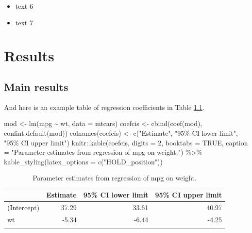 \documentclass[
  openany]{book}
\newenvironment{Shaded}{\begin{snugshade}}{\end{snugshade}}
\newcommand{\AttributeTok}[1]{\textcolor[rgb]{0.77,0.63,0.00}{#1}}
\newcommand{\ConstantTok}[1]{\textcolor[rgb]{0.00,0.00,0.00}{#1}}
\newcommand{\DecValTok}[1]{\textcolor[rgb]{0.00,0.00,0.81}{#1}}
\newcommand{\FunctionTok}[1]{\textcolor[rgb]{0.00,0.00,0.00}{#1}}
\newcommand{\NormalTok}[1]{#1}
\newcommand{\OtherTok}[1]{\textcolor[rgb]{0.56,0.35,0.01}{#1}}
\newcommand{\SpecialCharTok}[1]{\textcolor[rgb]{0.00,0.00,0.00}{#1}}
\newcommand{\StringTok}[1]{\textcolor[rgb]{0.31,0.60,0.02}{#1}}
\providecommand{\tightlist}{%
  \setlength{\itemsep}{0pt}\setlength{\parskip}{0pt}}
\begin{document}
\begin{itemize}
\tightlist
\item
  text 6
\item
  text 7
\end{itemize}

\hypertarget{results}{%
\chapter{Results}\label{results}}

\hypertarget{main-results}{%
\section{Main results}\label{main-results}}

And here is an example table of regression coefficients in Table \ref{tab:mtreg}.

\begin{Shaded}
\begin{Highlighting}[]
\NormalTok{mod }\OtherTok{\textless{}{-}} \FunctionTok{lm}\NormalTok{(mpg }\SpecialCharTok{\textasciitilde{}}\NormalTok{ wt, }\AttributeTok{data =}\NormalTok{ mtcars)}
\NormalTok{coefcis }\OtherTok{\textless{}{-}} \FunctionTok{cbind}\NormalTok{(}\FunctionTok{coef}\NormalTok{(mod), }\FunctionTok{confint.default}\NormalTok{(mod))}
\FunctionTok{colnames}\NormalTok{(coefcis) }\OtherTok{\textless{}{-}}
  \FunctionTok{c}\NormalTok{(}\StringTok{"Estimate"}\NormalTok{, }\StringTok{"95\% CI lower limit"}\NormalTok{, }\StringTok{"95\% CI upper limit"}\NormalTok{)}
\NormalTok{knitr}\SpecialCharTok{::}\FunctionTok{kable}\NormalTok{(coefcis,}
             \AttributeTok{digits =} \DecValTok{2}\NormalTok{,}
             \AttributeTok{booktabs =} \ConstantTok{TRUE}\NormalTok{,}
             \AttributeTok{caption =} \StringTok{"Parameter estimates from regression of mpg on weight."}\NormalTok{) }\SpecialCharTok{\%\textgreater{}\%}
  \FunctionTok{kable\_styling}\NormalTok{(}\AttributeTok{latex\_options =} \FunctionTok{c}\NormalTok{(}\StringTok{"HOLD\_position"}\NormalTok{))}
\end{Highlighting}
\end{Shaded}

\begin{table}[H]

\caption{\label{tab:mtreg}Parameter estimates from regression of mpg on weight.}
\centering
\begin{tabular}[t]{lrrr}
\toprule{}
  & Estimate & 95\% CI lower limit & 95\% CI upper limit\\
\midrule{}
(Intercept) & 37.29 & 33.61 & 40.97\\
wt & -5.34 & -6.44 & -4.25\\
\bottomrule{}
\end{tabular}
\end{table}
\end{document}
